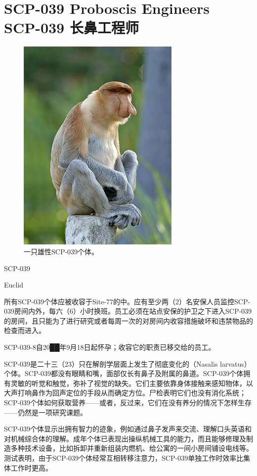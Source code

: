 \chapter[SCP-039 长鼻工程师]{
    SCP-039 Proboscis Engineers\\
    SCP-039 长鼻工程师
}

\label{chap:SCP-039}

\begin{figure}[H]
    \centering
    \includegraphics[width=0.5\linewidth]{images/SCP.039.png}
    \caption*{一只雄性SCP-039个体。}
\end{figure}

SCP-039

Euclid

所有SCP-039个体应被收容于Site-77的中。应有至少两（2）名安保人员监控SCP-039房间内外，每六（6）小时换班。员工必须在站点安保的护卫之下进入SCP-039的房间，且只能为了进行研究或者每周一次的对房间内收容措施破坏和违禁物品的检查而进入。

SCP-039-8自20██年9月18日起怀孕；收容它的职责已移交给的员工。

SCP-039是二十三（23）只在解剖学层面上发生了彻底变化的（Nasalis larvatus）个体。SCP-039都没有眼睛和嘴，面部仅长有鼻子及附属的鼻道。SCP-039个体拥有灵敏的听觉和触觉，弥补了视觉的缺失。它们主要依靠身体接触来感知物体，以大声打响鼻作为回声定位的手段从而确定方位。尸检表明它们也没有消化系统；SCP-039个体如何获取营养——或者，反过来，它们在没有养分的情况下怎样生存——仍然是一项研究课题。

SCP-039个体显示出拥有智力的迹象，例如通过鼻子发声来交流、理解口头英语和对机械综合体的理解。成年个体已表现出操纵机械工具的能力，而且能够修理及制造多种技术设备，比如拆卸并重新组装内燃机、给公寓的一间小房间铺设电线等。测试表明，由于SCP-039个体经常互相转移注意力，SCP-039单独工作时效率比集体工作时更高。

